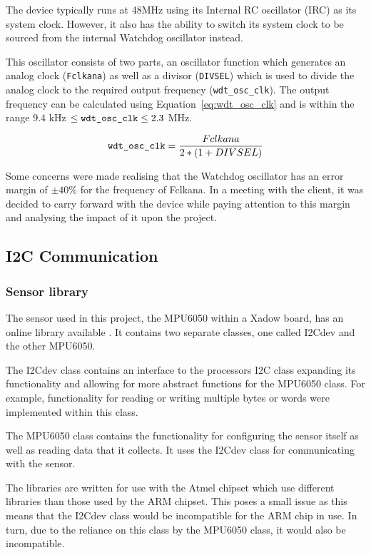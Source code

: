 The device typically runs at 48MHz using its Internal RC oscillator (IRC) as its system clock. However, it also has the ability to switch its system clock to be sourced from the internal Watchdog oscillator instead. 

This oscillator consists of two parts, an oscillator function which generates an analog clock (\verb|Fclkana|) as well as a divisor (\verb|DIVSEL|) which is used to divide the analog clock to the required output frequency (\verb|wdt_osc_clk|). The output frequency can be calculated using Equation~\ref{eq:wdt_osc_clk} and is within the range $ 9.4 $ kHz $ \leq \verb|wdt_osc_clk| \leq 2.3 $ MHz. \cite{mbed_datasheet}

\begin{equation}
	\label{eq:wdt_osc_clk}
	\verb|wdt_osc_clk| = \frac{Fclkana}{2 * (1 + DIVSEL)}
\end{equation}

Some concerns were made realising that the Watchdog oscillator has an error margin of $\pm 40\%$ for the frequency of Fclkana. In a meeting with the client, it was decided to carry forward with the device while paying attention to this margin and analysing the impact of it upon the project.

\subsection{I2C Communication}

\subsubsection{Sensor library}

The sensor used in this project, the MPU6050 within a Xadow board, has an online library available \cite{sensory_library}. It contains two separate classes, one called I2Cdev and the other MPU6050. 

The I2Cdev class contains an interface to the processors I2C class expanding its functionality and allowing for more abstract functions for the MPU6050 class. For example, functionality for reading or writing multiple bytes or words were implemented within this class.

The MPU6050 class contains the functionality for configuring the sensor itself as well as reading data that it collects. It uses the I2Cdev class for communicating with the sensor.

The libraries are written for use with the Atmel chipset which use different libraries than those used by the ARM chipset. This poses a small issue as this means that the I2Cdev class would be incompatible for the ARM chip in use. In turn, due to the reliance on this class by the MPU6050 class, it would also be incompatible. 

